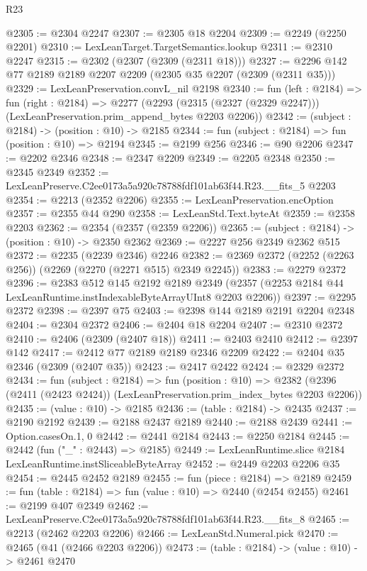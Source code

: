 \begin{lexlean}{R23}
\begin{coremodule}
@2305 := @2304 @2247
@2307 := @2305 @18 @2204
@2309 := @2249 (@2250 @2201)
@2310 := LexLeanTarget.TargetSemantics.lookup
@2311 := @2310 @2247
@2315 := @2302 (@2307 (@2309 (@2311 @18)))
@2327 := @2296 @142 @77 @2189 @2189 @2207 @2209 (@2305 @35 @2207 (@2309 (@2311 @35)))
@2329 := LexLeanPreservation.convL_nil @2198
@2340 := fun (left : @2184) =>
  fun (right : @2184) =>
  @2277 (@2293 (@2315 (@2327 (@2329 @2247))) (LexLeanPreservation.prim_append_bytes @2203 @2206))
@2342 := (subject : @2184) -> (position : @10) -> @2185
@2344 := fun (subject : @2184) => fun (position : @10) => @2194
@2345 := @2199 @256
@2346 := @90 @2206
@2347 := @2202 @2346
@2348 := @2347 @2209
@2349 := @2205 @2348
@2350 := @2345 @2349
@2352 := LexLeanPreserve.C2ee0173a5a920c78788fdf101ab63f44.R23.__fits_5 @2203
@2354 := @2213 (@2352 @2206)
@2355 := LexLeanPreservation.encOption
@2357 := @2355 @44 @290
@2358 := LexLeanStd.Text.byteAt
@2359 := @2358 @2203
@2362 := @2354 (@2357 (@2359 @2206))
@2365 := (subject : @2184) -> (position : @10) -> @2350 @2362
@2369 := @2227 @256 @2349 @2362 @515
@2372 := @2235 (@2239 @2346) @2246
@2382 := @2369 @2372 (@2252 (@2263 @256)) (@2269 (@2270 (@2271 @515) @2349 @2245))
@2383 := @2279 @2372
@2396 := @2383
    @512
    @145
    @2192
    @2189
    @2349
    (@2357 (@2253 @2184 @44 LexLeanRuntime.instIndexableByteArrayUInt8 @2203 @2206))
@2397 := @2295 @2372
@2398 := @2397 @75
@2403 := @2398 @144 @2189 @2191 @2204 @2348
@2404 := @2304 @2372
@2406 := @2404 @18 @2204
@2407 := @2310 @2372
@2410 := @2406 (@2309 (@2407 @18))
@2411 := @2403 @2410
@2412 := @2397 @142
@2417 := @2412 @77 @2189 @2189 @2346 @2209
@2422 := @2404 @35 @2346 (@2309 (@2407 @35))
@2423 := @2417 @2422
@2424 := @2329 @2372
@2434 := fun (subject : @2184) =>
  fun (position : @10) =>
  @2382 (@2396 (@2411 (@2423 @2424)) (LexLeanPreservation.prim_index_bytes @2203 @2206))
@2435 := (value : @10) -> @2185
@2436 := (table : @2184) -> @2435
@2437 := @2190 @2192
@2439 := @2188 @2437 @2189
@2440 := @2188 @2439
@2441 := Option.casesOn.{1, 0}
@2442 := @2441 @2184
@2443 := @2250 @2184
@2445 := @2442 (fun ("_" : @2443) => @2185)
@2449 := LexLeanRuntime.slice @2184 LexLeanRuntime.instSliceableByteArray
@2452 := @2449 @2203 @2206 @35
@2454 := @2445 @2452 @2189
@2455 := fun (piece : @2184) => @2189
@2459 := fun (table : @2184) => fun (value : @10) => @2440 (@2454 @2455)
@2461 := @2199 @407 @2349
@2462 := LexLeanPreserve.C2ee0173a5a920c78788fdf101ab63f44.R23.__fits_8
@2465 := @2213 (@2462 @2203 @2206)
@2466 := LexLeanStd.Numeral.pick
@2470 := @2465 (@41 (@2466 @2203 @2206))
@2473 := (table : @2184) -> (value : @10) -> @2461 @2470

\end{coremodule}
\end{lexlean}
